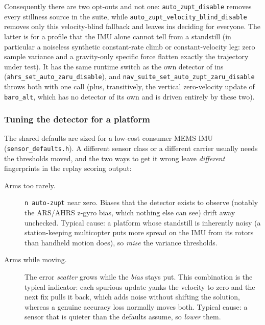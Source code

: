\documentclass[11pt,a4paper]{article}
\newcommand{\code}[1]{\texttt{#1}}
\begin{document}
Consequently there are two opt-outs and not one:
\code{auto\_\allowbreak{}zupt\_\allowbreak{}disable} removes every stillness source in the suite,
while \code{auto\_\allowbreak{}zupt\_\allowbreak{}velocity\_\allowbreak{}blind\_\allowbreak{}disable} removes only this
velocity-blind fallback and leaves ins deciding for everyone. The
latter is for a profile that the IMU alone cannot tell from a standstill (in
particular a noiseless synthetic constant-rate climb or constant-velocity leg:
zero sample variance and a gravity-only specific force
flatten exactly the trajectory under test). It has the same runtime switch as
the own detector of ins
(\code{ahrs\_\allowbreak{}set\_\allowbreak{}auto\_\allowbreak{}zaru\_\allowbreak{}disable}), and
\code{nav\_\allowbreak{}suite\_\allowbreak{}set\_\allowbreak{}auto\_\allowbreak{}zupt\_\allowbreak{}zaru\_\allowbreak{}disable} throws both with
one call (plus, transitively, the vertical zero-velocity update of
\code{baro\_\allowbreak{}alt}, which has no detector of its own and is driven
entirely by these two).

\subsubsection{Tuning the detector for a platform}
\label{sec:autozupt-tuning}

The shared defaults are sized for a low-cost consumer MEMS IMU
(\code{sensor\_\allowbreak{}defaults.h}). A different sensor class or a different
carrier usually needs the thresholds moved, and the two ways to get it
wrong leave \emph{different} fingerprints in the replay scoring output:

\begin{description}
  \item[Arms too rarely.] \code{n auto-zupt} near zero. Biases that the
    detector exists to observe (notably the ARS/AHRS z-gyro bias, which
    nothing else can see) drift away unchecked. Typical cause: a
    platform whose standstill is inherently noisy (a station-keeping
    multicopter puts more spread on the IMU from its rotors than
    handheld motion does), so \emph{raise} the variance thresholds.
  \item[Arms while moving.] The error \emph{scatter} grows while the
    \emph{bias} stays put. This combination is the typical indicator: each
    spurious update yanks the velocity to zero and the next fix pulls it
    back, which adds noise without shifting the solution, whereas a
    genuine accuracy loss normally moves both. Typical cause: a sensor
    that is quieter than the defaults assume, so \emph{lower} them.
\end{description}
\end{document}
